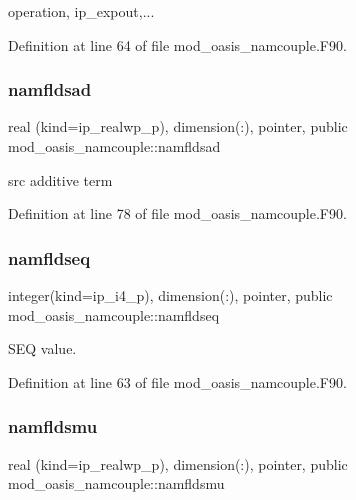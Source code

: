 operation, ip\+\_\+expout,... 



Definition at line 64 of file mod\+\_\+oasis\+\_\+namcouple.\+F90.

\mbox{\label{namespacemod__oasis__namcouple_a1729dba99742412a1e07a479cb7f7921}} 
\subsubsection{\texorpdfstring{namfldsad}{namfldsad}}
{\footnotesize\ttfamily real (kind=ip\+\_\+realwp\+\_\+p), dimension(\+:), pointer, public mod\+\_\+oasis\+\_\+namcouple\+::namfldsad}



src additive term 



Definition at line 78 of file mod\+\_\+oasis\+\_\+namcouple.\+F90.

\mbox{\label{namespacemod__oasis__namcouple_a54ccfe0380fc1c89d085f37a044a297e}} 
\subsubsection{\texorpdfstring{namfldseq}{namfldseq}}
{\footnotesize\ttfamily integer(kind=ip\+\_\+i4\+\_\+p), dimension(\+:), pointer, public mod\+\_\+oasis\+\_\+namcouple\+::namfldseq}



S\+EQ value. 



Definition at line 63 of file mod\+\_\+oasis\+\_\+namcouple.\+F90.

\mbox{\label{namespacemod__oasis__namcouple_ab52824ec91491253e02556a68ab31b09}} 
\subsubsection{\texorpdfstring{namfldsmu}{namfldsmu}}
{\footnotesize\ttfamily real (kind=ip\+\_\+realwp\+\_\+p), dimension(\+:), pointer, public mod\+\_\+oasis\+\_\+namcouple\+::namfldsmu}



